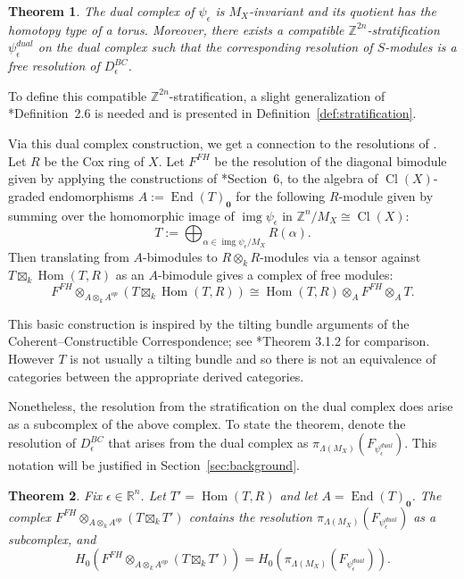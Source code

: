 \documentclass{amsart}
\newcommand{\ZZ}{\mathbb{Z}}
\newcommand{\RR}{\mathbb{R}}
\newcommand{\field}{k}
\newcommand{\Mepsilon}{D^{BC}_{\epsilon}}
\newcommand{\FFH}{F^{FH}}
\DeclareMathOperator{\Cl}{Cl}
\DeclareMathOperator{\Hom}{Hom}
\DeclareMathOperator{\End}{End}
\DeclareMathOperator{\img}{img}
\newtheorem{theorem}{Theorem}[section]
\theoremstyle{remark}
\begin{document}
\begin{theorem}
  \label{thm:dual-complex}
  The dual complex of $\psi_\epsilon$ is $M_X$-invariant and its quotient has the homotopy type of a torus.
  Moreover, there exists a compatible $\ZZ^{2n}$-stratification $\psi_\epsilon^{dual}$ on the dual complex such that the corresponding resolution of $S$-modules is a free resolution of $\Mepsilon$.
\end{theorem}

To define this compatible $\ZZ^{2n}$-stratification, a slight generalization of \cite{stratification-paper}*{Definition~2.6} is needed and is presented in Definition~\ref{def:stratification}.

Via this dual complex construction, we get a connection to the resolutions of \cite{FH25}.
Let $R$ be the Cox ring of $X$. Let $\FFH$ be the resolution of the diagonal bimodule given
by applying the constructions of \cite{FH25}*{Section~6}, to the algebra of $\Cl(X)$-graded endomorphisms
$A:=\End(T)_{\bm{0}}$ for the following $R$-module given by summing over the homomorphic image of
$\img \psi_\epsilon$ in $\ZZ^{n}/M_X\cong \Cl(X)$:
\[T := \bigoplus_{\alpha\in \img \psi_\epsilon / M_X} R(\alpha).\]
Then translating from $A$-bimodules to $R\otimes_{\field} R$-modules via a tensor against $T \boxtimes_{\field}\Hom(T,R)$ as an $A$-bimodule gives a complex of free modules:
\[\FFH\otimes_{A\otimes_{\field}A^{op}} (T\boxtimes_{\field} \Hom(T,R))\cong \Hom(T,R)\otimes_{A} \FFH \otimes_{A} T.\]

This basic construction is inspired by the tilting bundle arguments of the Coherent--Constructible Correspondence; see \cite{baer-tilting}*{Theorem 3.1.2} for comparison.
However $T$ is not usually a tilting bundle and so there is not an equivalence of categories between the appropriate derived categories.

Nonetheless, the resolution from the stratification on the dual complex does arise as a subcomplex of the above complex. To state the theorem, denote the resolution of $\Mepsilon$ that arises from the dual complex as $\pi_{\Lambda(M_X)}(F_{\psi_{\epsilon}^{dual}})$. This notation will be justified in Section~\ref{sec:background}. 

\begin{theorem}
  \label{thm:hpa-pdim}
  Fix $\epsilon \in \RR^n$.
  Let $T'=\Hom(T,R)$ and let $A=\End(T)_{\bm{0}}$.
  The complex $\FFH\otimes_{A\otimes_{\field}A^{op}} (T\boxtimes_{\field} T')$ contains the resolution $\pi_{\Lambda(M_X)}(F_{\psi_{\epsilon}^{dual}})$ as a subcomplex, and
  \[H_0(\FFH\otimes_{A\otimes_{\field}A^{op}} (T\boxtimes_{\field} T')) = H_0(\pi_{\Lambda(M_X)}(F_{\psi_{\epsilon}^{dual}})).\]
\end{theorem}
\end{document}
